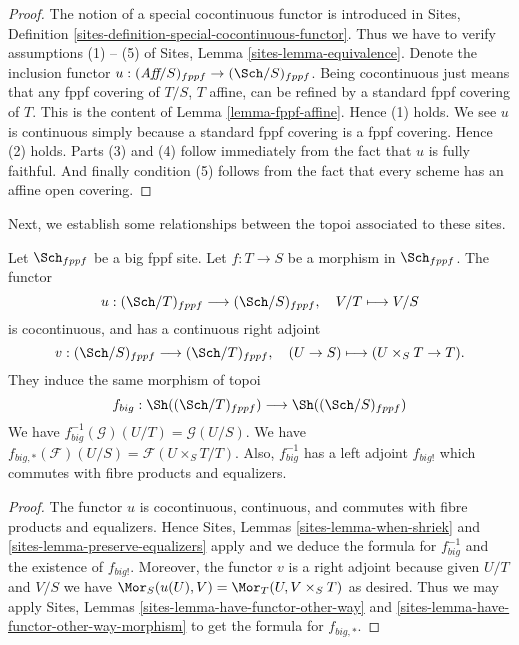 \begin{proof}
The notion of a special cocontinuous functor is introduced in
Sites, Definition \ref{sites-definition-special-cocontinuous-functor}.
Thus we have to verify assumptions (1) -- (5) of
Sites, Lemma \ref{sites-lemma-equivalence}.
Denote the inclusion functor
$u : (\textit{Aff}/S)_{fppf} \to (\Sch/S)_{fppf}$.
Being cocontinuous just means that any fppf covering of
$T/S$, $T$ affine, can be refined by a standard fppf covering of $T$.
This is the content of
Lemma \ref{lemma-fppf-affine}.
Hence (1) holds. We see $u$ is continuous simply because a standard
fppf covering is a fppf covering. Hence (2) holds.
Parts (3) and (4) follow immediately from the fact that $u$ is
fully faithful. And finally condition (5) follows from the
fact that every scheme has an affine open covering.
\end{proof}

\noindent
Next, we establish some relationships between the topoi
associated to these sites.

\begin{lemma}
\label{lemma-morphism-big-fppf}
Let $\Sch_{fppf}$ be a big fppf site.
Let $f : T \to S$ be a morphism in $\Sch_{fppf}$.
The functor
$$
u : (\Sch/T)_{fppf} \longrightarrow (\Sch/S)_{fppf},
\quad
V/T \longmapsto V/S
$$
is cocontinuous, and has a continuous right adjoint
$$
v : (\Sch/S)_{fppf} \longrightarrow (\Sch/T)_{fppf},
\quad
(U \to S) \longmapsto (U \times_S T \to T).
$$
They induce the same morphism of topoi
$$
f_{big} :
\Sh((\Sch/T)_{fppf})
\longrightarrow
\Sh((\Sch/S)_{fppf})
$$
We have $f_{big}^{-1}(\mathcal{G})(U/T) = \mathcal{G}(U/S)$.
We have $f_{big, *}(\mathcal{F})(U/S) = \mathcal{F}(U \times_S T/T)$.
Also, $f_{big}^{-1}$ has a left adjoint $f_{big!}$ which commutes with
fibre products and equalizers.
\end{lemma}

\begin{proof}
The functor $u$ is cocontinuous, continuous, and commutes with fibre products
and equalizers. Hence
Sites, Lemmas \ref{sites-lemma-when-shriek} and
\ref{sites-lemma-preserve-equalizers}
apply and we deduce the formula
for $f_{big}^{-1}$ and the existence of $f_{big!}$. Moreover,
the functor $v$ is a right adjoint because given $U/T$ and $V/S$
we have $\Mor_S(u(U), V) = \Mor_T(U, V \times_S T)$
as desired. Thus we may apply
Sites, Lemmas \ref{sites-lemma-have-functor-other-way} and
\ref{sites-lemma-have-functor-other-way-morphism} to get the
formula for $f_{big, *}$.
\end{proof}

